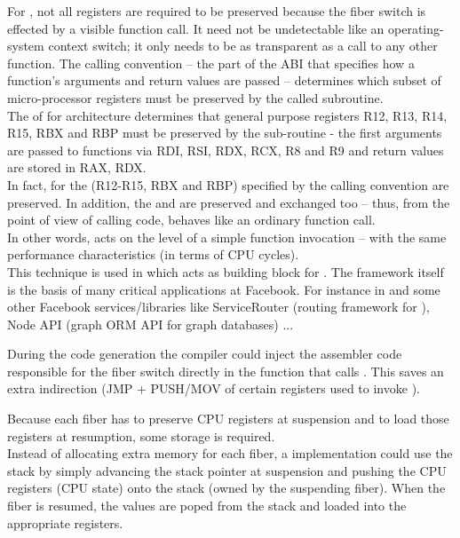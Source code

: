 \label{callingconvention}
For \fiber, not all registers are required to be preserved because the fiber
switch is effected by a visible function call. It need not be undetectable like
an operating-system context switch; it only needs to be as transparent as a call
to any other function. The calling convention -- the part of the ABI that
specifies how a function's arguments and return values are passed -- determines
which subset of micro-processor registers must be preserved by the called
subroutine.\\

The \cite{SYSVABI} of  for 
architecture determines that general purpose registers R12, R13, R14, R15, RBX
and RBP must be preserved by the sub-routine - the first arguments are passed
to functions via RDI, RSI, RDX, RCX, R8 and R9 and return values are stored in
RAX, RDX.\\
In fact, for \resume the  (R12-R15, RBX and RBP)
specified by the calling convention are preserved. In addition, the  and  are preserved and exchanged too -- thus,
from the point of view of calling code, \resume behaves like an ordinary
function call.\\
In other words, \resume acts on the level of a simple function invocation --
with the same performance characteristics (in terms of CPU cycles).\\

This technique is used in \bcontext\cite{bcontext} which acts as building block
for \fbfibers. The \fbfibers\xspace framework itself is the basis of many
critical applications at Facebook. For instance in \fbmcrouter\cite{fbmcrouter}
and some other Facebook services/libraries like ServiceRouter (routing framework
for \fbthrift\cite{fbthrift}), Node API (graph ORM API for graph databases) ...

 During the code generation
the compiler could inject the assembler code responsible for the fiber switch
directly in the function that calls \resume. This saves an extra indirection
(JMP + PUSH/MOV of certain registers used to invoke \resume).

 Because each fiber has to preserve CPU
registers at suspension and to load those registers at resumption, some storage
is required.\\
Instead of allocating extra memory for each fiber, a implementation could use
the stack by simply advancing the stack pointer at suspension and pushing the
CPU registers (CPU state) onto the stack (owned by the suspending fiber). When
the fiber is resumed, the values are poped from the stack and loaded into the
appropriate registers.\\

